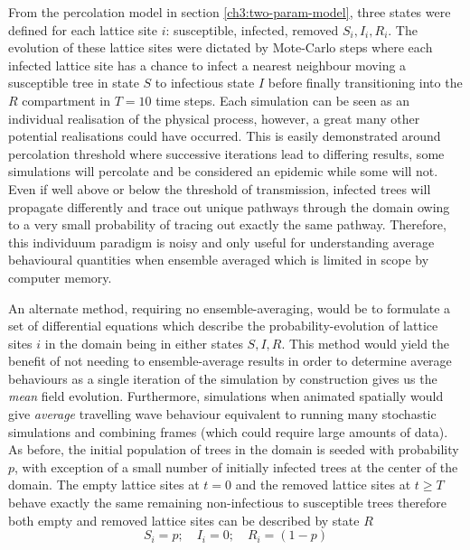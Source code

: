 From the percolation model in section \ref{ch3:two-param-model}, three states were defined for each lattice site $i$: susceptible, infected, removed $S_i, I_i, R_i$. The evolution of these lattice sites were dictated by Mote-Carlo steps where each infected lattice site has a chance to infect a nearest neighbour moving a susceptible tree in state $S$ to infectious state $I$ before finally transitioning into the $R$ compartment in $T=10$ time steps. Each simulation can be seen as an individual realisation of the physical process, however, a great many other potential realisations could have occurred. This is easily demonstrated around percolation threshold where successive iterations lead to differing results, some simulations will percolate and be considered an epidemic while some will not. Even if well above or below the threshold of transmission, infected trees will propagate differently and trace out unique pathways through the domain owing to a very small probability of tracing out exactly the same pathway. Therefore, this individuum paradigm is noisy and only useful for understanding average behavioural quantities when ensemble averaged which is limited in scope by computer memory.

An alternate method, requiring no ensemble-averaging, would be to formulate a set of differential equations which describe the probability-evolution of lattice sites $i$ in the domain being in either states $S,I,R$. This method would yield the benefit of not needing to ensemble-average results in order to determine average behaviours as a single iteration of the simulation by construction gives us the \textit{mean} field evolution. Furthermore, simulations when animated spatially would give \textit{average} travelling wave behaviour equivalent to running many stochastic simulations and combining frames (which could require large amounts of data). As before, the initial population of trees in the domain is seeded with probability $p$, with exception of a small number of initially infected trees at the center of the domain. The empty lattice sites at $t=0$ and the removed lattice sites at $t \ge T$ behave exactly the same remaining non-infectious to susceptible trees therefore both empty and removed lattice sites can be described by state $R$
\begin{equation}
       S_i = p;\quad I_i = 0;\quad R_i = (1 - p) 
\end{equation}{}

